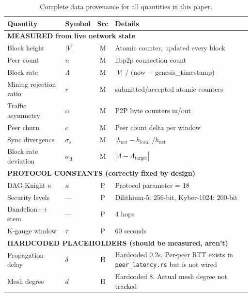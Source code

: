 \documentclass[11pt,a4paper]{article}
\begin{document}
\begin{table}[H]
\centering
\caption{Complete data provenance for all quantities in this paper.}
\label{tab:provenance}
\small
\begin{tabular}{@{}p{3.5cm}lcp{5cm}@{}}
\toprule
\textbf{Quantity} & \textbf{Symbol} & \textbf{Src} & \textbf{Details} \\
\midrule
\multicolumn{4}{l}{\textbf{\textcolor{measured}{MEASURED from live network state}}} \\
\midrule
Block height & $|V|$ & \textcolor{measured}{M} & Atomic counter, updated every block \\
Peer count & $n$ & \textcolor{measured}{M} & libp2p connection count \\
Block rate & $\Lambda$ & \textcolor{measured}{M} & $|V|$ / (now $-$ genesis\_timestamp) \\
Mining rejection ratio & $r$ & \textcolor{measured}{M} & submitted/accepted atomic counters \\
Traffic asymmetry & $\alpha$ & \textcolor{measured}{M} & P2P byte counters in/out \\
Peer churn & $c$ & \textcolor{measured}{M} & Peer count delta per window \\
Sync divergence & $\sigma_s$ & \textcolor{measured}{M} & $|h_{\text{net}} - h_{\text{local}}|/h_{\text{net}}$ \\
Block rate deviation & $\sigma_\Lambda$ & \textcolor{measured}{M} & $|\Lambda - \Lambda_{\text{target}}|$ \\
\midrule
\multicolumn{4}{l}{\textbf{\textcolor{sectionblue}{PROTOCOL CONSTANTS (correctly fixed by design)}}} \\
\midrule
DAG-Knight $\kappa$ & $\kappa$ & \textcolor{sectionblue}{P} & Protocol parameter = 18 \\
Security levels & --- & \textcolor{sectionblue}{P} & Dilithium-5: 256-bit, Kyber-1024: 200-bit \\
Dandelion++ stem & --- & \textcolor{sectionblue}{P} & 4 hops \\
K-gauge window & $\tau$ & \textcolor{sectionblue}{P} & 60 seconds \\
\midrule
\multicolumn{4}{l}{\textbf{\textcolor{hardcoded}{HARDCODED PLACEHOLDERS (should be measured, aren't)}}} \\
\midrule
Propagation delay & $\delta$ & \textcolor{hardcoded}{H} & Hardcoded 0.2s. Per-peer RTT exists in \texttt{peer\_latency.rs} but is not wired \\
Mesh degree & $d$ & \textcolor{hardcoded}{H} & Hardcoded 8. Actual mesh degree not tracked \\

\end{tabular}
\end{table}
\end{document}
